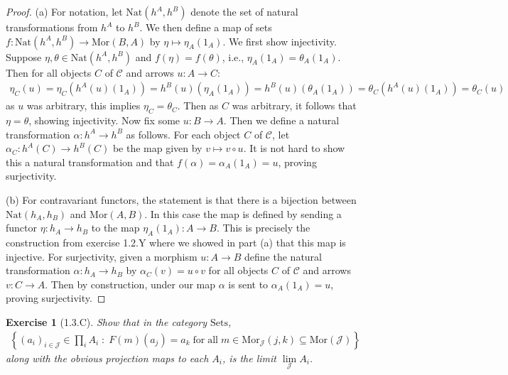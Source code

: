 \documentclass{amsart}
\newtheorem*{exercise*}{Exercise}
\begin{document}
\begin{proof}
		(a) For notation, let $\mathrm{Nat}(h^A, h^B)$ denote the set of natural transformations from $h^A$ to $h^B$. We then define a map of sets $f:\mathrm{Nat}(h^A, h^B)\rightarrow \mathrm{Mor}(B, A)$ by $\eta\mapsto \eta_A(1_A)$. We first show injectivity. Suppose $\eta, \theta\in \mathrm{Nat}(h^A, h^B)$ and $f(\eta)=f(\theta)$, i.e., $\eta_A(1_A)=\theta_A(1_A)$. Then for all objects $C$ of $\mathscr{C}$ and arrows $u:A\rightarrow C$:
    \begin{align*}
        \eta_C(u) = \eta_C(h^A(u)(1_A)) = h^B(u)(\eta_A(1_A))=h^B(u)(\theta_A(1_A))=\theta_C(h^A(u)(1_A))=\theta_C(u)
    \end{align*}
    as $u$ was arbitrary, this implies $\eta_C=\theta_C$. Then as $C$ was arbitrary, it follows that $\eta=\theta$, showing injectivity. Now fix some $u:B\rightarrow A$. Then we define a natural transformation $\alpha:h^A\rightarrow h^B$ as follows. For each object $C$ of $\mathscr{C}$, let $\alpha_C:h^A(C)\rightarrow h^B(C)$ be the map given by $v\mapsto v\circ u$. It is not hard to show this a natural transformation and that $f(\alpha)=\alpha_A(1_A)=u$, proving surjectivity. 

    \vspace{0.1in}

    (b) For contravariant functors, the statement is that there is a bijection between $\mathrm{Nat}(h_A, h_B)$ and $\mathrm{Mor}(A, B)$. In this case the map is defined by sending a functor $\eta:h_A\rightarrow h_B$ to the map $\eta_A(1_A):A\rightarrow B$. This is precisely the construction from exercise 1.2.Y where we showed in part (a) that this map is injective. For surjectivity, given a morphism $u:A\rightarrow B$ define the natural transformation $\alpha:h_A\rightarrow h_B$ by $\alpha_C(v)=u\circ v$ for all objects $C$ of $\mathscr{C}$ and arrows $v:C\rightarrow A$. Then by construction, under our map $\alpha$ is sent to $\alpha_A(1_A)=u$, proving surjectivity. 
\end{proof}

\vspace{0.1in}


\begin{exercise*}[1.3.C]
    Show that in the category $\mathrm{Sets}$,
    \begin{align*}
        \left\{ (a_i)_{i\in\mathscr{J}}\in \prod_{i}A_i \;: \; F(m)(a_j)=a_k\;\mathrm{for\;all\;}m\in\mathrm{Mor}_\mathscr{J}(j, k)\subseteq\mathrm{Mor}(\mathscr{J})\right\}
    \end{align*}
    along with the obvious projection maps to each $A_i$, is the limit $\lim\limits_{\mathscr{J}} A_i$.
\end{exercise*}
\end{document}
